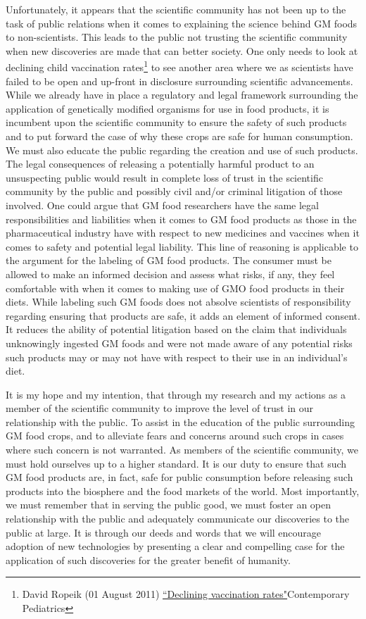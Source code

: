 \documentclass[letterpaper,10pt,twoside]{article}
\begin{document}
Unfortunately, it appears that the scientific community has not been up to the task of public relations when it comes to explaining the science behind GM foods to non-scientists.  This leads to the public not trusting the scientific community when new discoveries are made that can better society.  One only needs to look at declining child vaccination rates\footnote{ David Ropeik (01 August 2011) \href{http://contemporarypediatrics.modernmedicine.com/contemporary-pediatrics/news/modernmedicine/modern-medicine-now/declining-vaccination-rates}{``Declining vaccination rates"}Contemporary Pediatrics} to see another area where we as scientists have failed to be open and up-front in disclosure surrounding scientific advancements.  While we already have in place a regulatory and legal framework surrounding the application of genetically modified organisms for use in food products, it is incumbent upon the scientific community to ensure the safety of such products and to put forward the case of why these crops are safe for human consumption.  We must also educate the public regarding the creation and use of such products.  The legal consequences of releasing a potentially harmful product to an unsuspecting public would result in complete loss of trust in the scientific community by the public and possibly civil and/or criminal litigation of those involved.  One could argue that GM food researchers have the same legal responsibilities and liabilities when it comes to GM food products as those in the pharmaceutical industry have with respect to new medicines and vaccines when it comes to safety and potential legal liability.  This line of reasoning is applicable to the argument for the labeling of GM food products.  The consumer must be allowed to make an informed decision and assess what risks, if any, they feel comfortable with when it comes to making use of GMO food products in their diets.  While labeling such GM foods does not absolve scientists of responsibility regarding ensuring that products are safe, it adds an element of informed consent.  It reduces the ability of potential litigation based on the claim that individuals unknowingly ingested GM foods and were not made aware of any potential risks such products may or may not have with respect to their use in an individual's diet.

It is my hope and my intention, that through my research and my actions as a member of the scientific community to improve the level of trust in our relationship with the public.  To assist in the education of the public surrounding GM food crops, and to alleviate fears and concerns around such crops in cases where such concern is not warranted.  As members of the scientific community, we must hold ourselves up to a higher standard.  It is our duty to ensure that such GM food products are, in fact, safe for public consumption before releasing such products into the biosphere and the food markets of the world.  Most importantly, we must remember that in serving the public good, we must foster an open relationship with the public and adequately communicate our discoveries to the public at large.  It is through our deeds and words that we will encourage adoption of new technologies by presenting a clear and compelling case for the application of such discoveries for the greater benefit of humanity.
\end{document}
